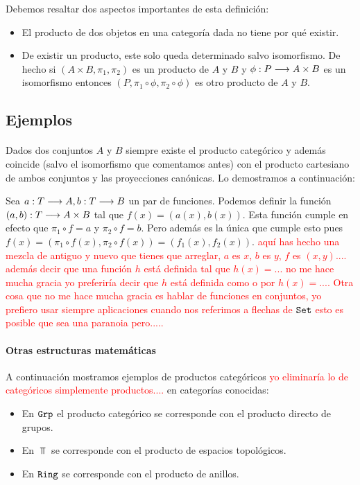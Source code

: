 Debemos resaltar dos aspectos importantes de esta definición:
\begin{itemize}
\item El producto de dos objetos en una categoría dada no tiene por qué
      existir.
\item De existir un producto, este solo queda determinado salvo isomorfismo. De hecho si $(A\times B, \pi_1, \pi_2)$ es un producto de $A$ y $B$
y $\phi : P\longrightarrow A\times B$ es un isomorfismo entonces
$(P, \pi_1 \circ \phi , \pi_2 \circ \phi)$ es otro producto de $A$
y $B$.
\end{itemize}


\subsection{Ejemplos}
\paragraph{\Set}
Dados dos conjuntos $A$ y $B$ siempre existe el producto categórico
y además coincide (salvo el isomorfismo
que comentamos antes) con el producto cartesiano de ambos conjuntos
y las proyecciones canónicas. Lo demostramos a continuación:

Sea $a : T\longrightarrow A, b : T\longrightarrow B$ un par de funciones. Podemos
definir la función $(a, b) : T\longrightarrow A\times B$ tal que
$f(x) = (a(x), b(x))$. Esta función cumple en efecto que
$\pi_1 \circ f = a$ y $\pi_2 \circ f = b$. Pero además es la única
que cumple esto pues
$f(x)=(\pi_1\circ f(x), \pi_2\circ f(x))=(f_1(x), f_2(x))$. \textcolor{red}{aquí has hecho una mezcla de antiguo y nuevo que tienes que arreglar, $a$ es $x$, $b$ es $y$, $f$ es $(x,y)$.... además decir que una función $h$ está definida tal que $h(x)=...$ no me hace mucha gracia yo preferiría decir que $h$ está definida como o por $h(x)=....$ Otra cosa que no me hace mucha gracia es hablar de funciones en conjuntos, yo prefiero usar siempre aplicaciones cuando nos referimos a flechas de $\texttt{Set}$ esto es posible que sea una paranoia pero..... }

\paragraph{Otras estructuras matemáticas}
A continuación mostramos ejemplos de productos categóricos \textcolor{red}{yo eliminaría lo de categóricos simplemente productos....}
en categorías conocidas:

\begin{itemize}
\item En $\texttt{Grp}$ el producto categórico se corresponde con el
producto directo de grupos.
\item En $\Top$ se corresponde con el producto de espacios topológicos.
\item En $\texttt{Ring}$ se corresponde con el producto de anillos.
\end{itemize}

